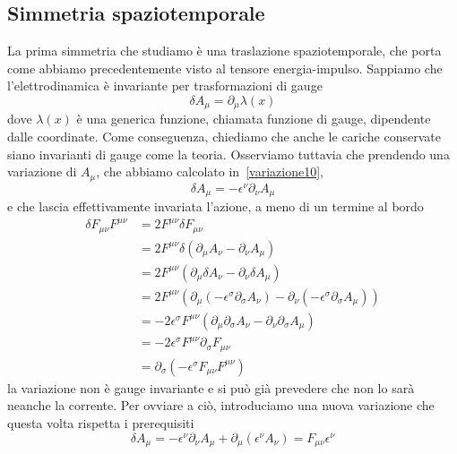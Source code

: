 \subsection{Simmetria spaziotemporale}
    La prima simmetria che studiamo è una traslazione spaziotemporale, che porta come abbiamo precedentemente visto al tensore energia-impulso. Sappiamo che l'elettrodinamica è invariante per trasformazioni di gauge 
\begin{equation*}
    \delta A_\mu = \partial_\mu \lambda(x)
\end{equation*}
    dove $\lambda(x)$ è una generica funzione, chiamata funzione di gauge, dipendente dalle coordinate. Come conseguenza, chiediamo che anche le cariche conservate siano invarianti di gauge come la teoria. Osserviamo tuttavia che prendendo una variazione di $A_\mu$, che abbiamo calcolato in~\eqref{variazione10}, 
\begin{equation*}
    \delta A_\mu = - \epsilon^\nu \partial_\nu A_\mu
\end{equation*}
    e che lascia effettivamente invariata l'azione, a meno di un termine al bordo
\begin{equation*}
\begin{aligned}
    \delta F_{\mu\nu} F^{\mu\nu} & = 2 F^{\mu\nu} \delta F_{\mu\nu} \\ & = 2 F^{\mu\nu} \delta (\partial_\mu A_\nu - \partial_\nu A_\mu) \\ & = 2 F^{\mu\nu} ( \partial_\mu \delta A_\nu - \partial_\nu \delta A_\mu) \\ & = 2 F^{\mu\nu} ( \partial_\mu (- \epsilon^\sigma \partial_\sigma A_\nu) - \partial_\nu (- \epsilon^\sigma \partial_\sigma A_\mu)) \\ & = - 2 \epsilon^\sigma F^{\mu\nu} ( \partial_\mu \partial_\sigma A_\nu - \partial_\nu \partial_\sigma A_\mu) \\ & = - 2 \epsilon^\sigma F^{\mu\nu} \partial_\sigma F_{\mu\nu} \\ & = \partial_\sigma (-\epsilon^\sigma F_{\mu\nu} F^{\mu\nu})
\end{aligned}
\end{equation*}
    la variazione non è gauge invariante e si può già prevedere che non lo sarà neanche la corrente. Per ovviare a ciò, introduciamo una nuova variazione che questa volta rispetta i prerequisiti 
\begin{equation*}
    \delta A_\mu = - \epsilon^\nu \partial_\nu A_\mu + \partial_\mu (\epsilon^\nu A_\nu) = F_{\mu\nu} \epsilon^\nu
\end{equation*}
